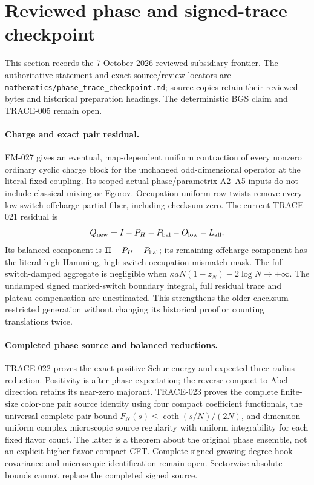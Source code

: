 \section{Reviewed phase and signed-trace checkpoint}
\label{sec:checked-phase-trace-checkpoint}

This section records the 7 October 2026 reviewed subsidiary frontier.
The authoritative statement and exact source/review locators are
\texttt{mathematics/phase\_trace\_checkpoint.md}; source copies retain their
reviewed bytes and historical preparation headings. The deterministic
BGS claim and TRACE-005 remain open.

\paragraph{Charge and exact pair residual.}
FM-027 gives an eventual, map-dependent uniform contraction of every
nonzero ordinary cyclic charge block for the unchanged odd-dimensional
operator at the literal fixed coupling. Its scoped actual phase/parametrix
A2--A5 inputs do not include classical mixing or Egorov. Occupation-uniform
row twists remove every low-switch offcharge partial fiber, including
checksum zero. The current TRACE-021 residual is
\[
 Q_{\rm new}=I-P_H-P_{\rm bal}-O_{\rm low}-L_{\rm all}.
\]
Its balanced component is $\Pi-P_H-P_{\rm bal}$; its remaining offcharge
component has the literal high-Hamming, high-switch occupation-mismatch
mask. The full switch-damped aggregate is negligible when
$\kappa aN(1-z_N)-2\log N\to+\infty$. The undamped signed marked-switch
boundary integral, full residual trace and plateau compensation are
unestimated. This strengthens the older checksum-restricted generation
without changing its historical proof or counting translations twice.

\paragraph{Completed phase source and balanced reductions.}
TRACE-022 proves the exact positive Schur-energy and expected three-radius
reduction. Positivity is after phase expectation; the reverse
compact-to-Abel direction retains its near-zero majorant.
TRACE-023 proves the complete finite-size color-one pair source identity
using four compact coefficient functionals, the universal complete-pair
bound $F_N(s)\le\coth(s/N)/(2N)$, and dimension-uniform complex microscopic
source regularity with uniform integrability for each fixed flavor count.
The latter is a theorem about the original phase ensemble, not an explicit
higher-flavor compact CFT. Complete signed growing-degree hook covariance
and microscopic identification remain open. Sectorwise absolute bounds
cannot replace the completed signed source.

